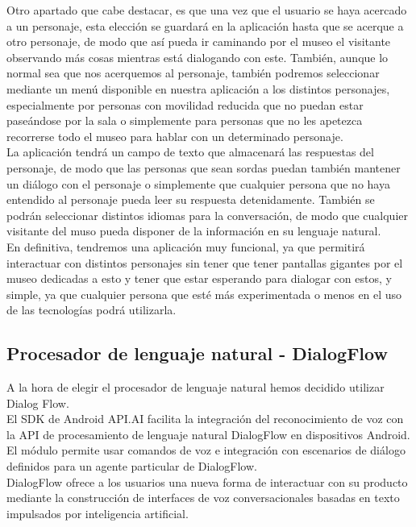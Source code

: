 Otro apartado que cabe destacar, es que una vez que el usuario se haya acercado a un personaje, esta elección se guardará en la aplicación hasta que se acerque a otro personaje, de modo que así pueda ir caminando por el museo el visitante observando más cosas mientras está dialogando con este. También, aunque lo normal sea que nos acerquemos al personaje, también podremos seleccionar mediante un menú disponible en nuestra aplicación a los distintos personajes, especialmente por personas con movilidad reducida que no puedan estar paseándose por la sala o simplemente para personas que no les apetezca recorrerse todo el museo para hablar con un determinado personaje. \\

La aplicación tendrá un campo de texto que almacenará las respuestas del personaje, de modo que las personas que sean sordas puedan también mantener un diálogo con el personaje o simplemente que cualquier persona que no haya entendido al personaje pueda leer su respuesta detenidamente. También se podrán seleccionar distintos idiomas para la conversación, de modo que cualquier visitante del muso pueda disponer de la información en su lenguaje natural. \\

En definitiva, tendremos una aplicación muy funcional, ya que permitirá interactuar con distintos personajes sin tener que tener pantallas gigantes por el museo dedicadas a esto y tener que estar esperando para dialogar con estos, y simple, ya que cualquier persona que esté más experimentada o menos en el uso de las tecnologías podrá utilizarla.

\subsection{Procesador de lenguaje natural - DialogFlow}

A la hora de elegir el procesador de lenguaje natural hemos decidido utilizar Dialog Flow.\\ 

El SDK de Android API.AI facilita la integración del reconocimiento de voz con la API de procesamiento de lenguaje natural DialogFlow en dispositivos Android. El módulo permite usar comandos de voz e integración con escenarios de diálogo definidos para un agente particular de DialogFlow. \cite{git}\\

DialogFlow ofrece a los usuarios una nueva forma de interactuar con su producto mediante la construcción de interfaces de voz conversacionales basadas en texto impulsados por inteligencia artificial. \\

